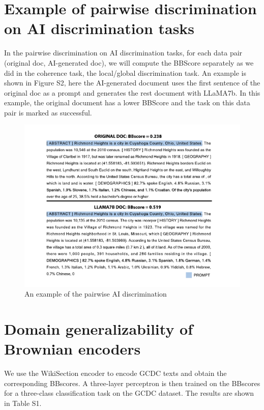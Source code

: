 \documentclass[letterpaper]{article}
\begin{document}
\section{Example of pairwise discrimination on AI discrimination tasks}
\label{pairai}
In the pairwise discrimination on AI discrimination tasks, for each data pair (original doc, AI-generated doc), we will compute the BBScore separately as we did in the coherence task, the local/global discrimination task. An example is shown in Figure S2, here the AI-generated document uses the first sentence of the original doc as a prompt and generates the rest document with LLaMA7b. In this example, the original document has a lower BBScore and the task on this data pair is marked as successful.
\begin{figure}[htbp]
\centering
\includegraphics[width=1.15\linewidth,trim={1.1cm 0cm 0cm 0cm},clip]{pictures/AItext.pdf}
\caption{An example of the pairwise AI discrimination}
\label{fig:ai_example}
\end{figure}

\section{Domain generalizability of Brownian encoders}
\label{app:gcdc}
We use the WikiSection encoder to encode GCDC texts and obtain the corresponding BBscores. A three-layer perceptron is then trained on the BBscores for a three-class classification task on the GCDC dataset. The results are shown in Table S1.
\end{document}
